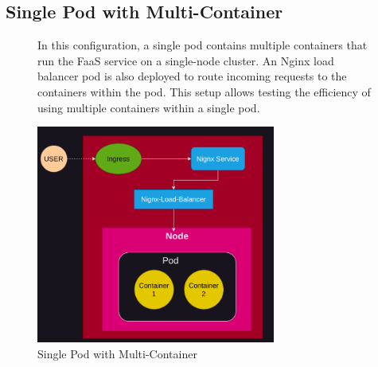 \documentclass{article}
\begin{document}
\subsection{Single Pod with Multi-Container}
\nobreak
\vspace{-30px}
\begin{figure}[h]
    \begin{minipage}[t]{0.6\textwidth}
        \vspace{-120px}
        In this configuration, a single pod contains multiple containers that
        run the FaaS service on a single-node cluster. An Nginx load balancer
        pod is also deployed to route incoming requests to the containers
        within the pod. This setup allows testing the efficiency of using
        multiple containers within a single pod.
    \end{minipage}%
    \hfill
    \begin{minipage}[b]{0.4\textwidth}
        \centering
        \includegraphics[width=0.7\textwidth]{../images/one_pod_two_container.png}
        \caption{Single Pod with Multi-Container}
        \label{fig:single_pod_multi_container}
    \end{minipage}
\end{figure}
\newpage

\vspace{-10px}
\end{document}
